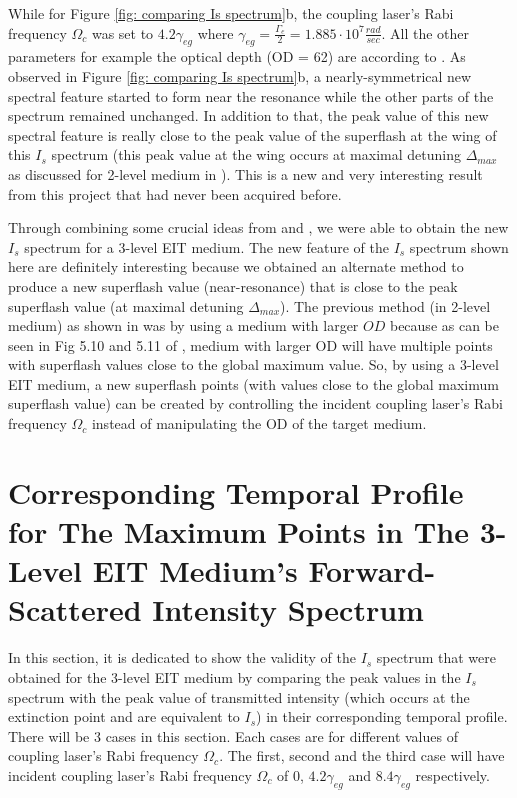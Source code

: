 While for Figure \ref{fig: comparing Is spectrum}b, the coupling laser's Rabi frequency $\Omega_{c}$ was set to $4.2\gamma_{eg}$ where $\gamma_{eg} = \frac{\Gamma_{e}}{2} = 1.885 \cdot 10^{7} \frac{rad}{sec}$. All the other parameters for example the optical depth (OD = 62) are according to . As observed in Figure \ref{fig: comparing Is spectrum}b, a nearly-symmetrical new spectral feature started to form near the resonance while the other parts of the spectrum remained unchanged. In addition to that, the peak value of this new spectral feature is really close to the peak value of the superflash at the wing of this $I_{s}$ spectrum (this peak value at the wing occurs at maximal detuning $\Delta_{max}$ as discussed for 2-level medium in ). This is a new and very interesting result from this project that had never been acquired before.

Through combining some crucial ideas from  and , we were able to obtain the new $I_{s}$ spectrum for a 3-level EIT medium. The new feature of the $I_{s}$ spectrum shown here are definitely interesting because we obtained an alternate method to produce a new superflash value (near-resonance) that is close to the peak superflash value (at maximal detuning $\Delta_{max}$). The previous method (in 2-level medium) as shown in  was by using a medium with larger $OD$ because as can be seen in Fig 5.10 and 5.11 of , medium with larger OD will have multiple points with superflash values close to the global maximum value. So, by using a 3-level EIT medium, a new superflash points (with values close to the global maximum superflash value) can be created by controlling the incident coupling laser's Rabi frequency $\Omega_{c}$ instead of manipulating the OD of the target medium.


\section{Corresponding Temporal Profile for The Maximum Points in The 3-Level EIT Medium's Forward-Scattered Intensity Spectrum}
In this section, it is dedicated to show the validity of the $I_{s}$ spectrum that were obtained for the 3-level EIT medium by comparing the peak values in the $I_{s}$ spectrum with the peak value of transmitted intensity (which occurs at the extinction point and are equivalent to $I_{s}$) in their corresponding temporal profile. There will be 3 cases in this section. Each cases are for different values of coupling laser's Rabi frequency $\Omega_{c}$. The first, second and the third case will have incident coupling laser's Rabi frequency $\Omega_{c}$ of $0$, $4.2\gamma_{eg}$ and $8.4\gamma_{eg}$ respectively.

